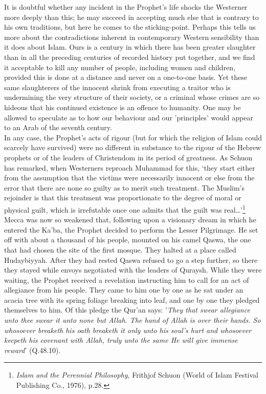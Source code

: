 \documentclass[10pt, twoside,openright]{book}
\begin{document}
It is doubtful whether any incident in the Prophet's life shocks the Westerner more deeply than this; 
he may succeed in accepting much else that is contrary to his own traditions, but here he comes to 
the sticking\hyp{}point. Perhaps this tells us more about the contradictions inherent in contemporary 
Western sensibility than it does about Islam. Ours is a century in which there has been greater 
slaughter than in all the preceding centuries of recorded history put together, and we find it 
acceptable to kill any number of people, including women and children, provided this is done at a 
distance and never on a one\hyp{}to\hyp{}one basis. Yet these same slaughterers of the innocent shrink from 
executing a traitor who is undermining the very structure of their society, or a criminal whose 
crimes are so hideous that his continued existence is an offence to humanity. One may be allowed to 
speculate as to how our behaviour and our 'principles' would appear to an Arab of the seventh 
century. \\

In any case, the Prophet's acts of rigour (but for which the religion of Islam could scarcely have 
survived) were no different in substance to the rigour of the Hebrew prophets or of the leaders of 
Christendom in its period of greatness. As Schuon has remarked, when Westerners reproach Muhammad for 
this, `they start either from the assumption that the victims were necessarily innocent or else from 
the error that there are none so guilty as to merit such treatment. The Muslim's rejoinder is that 
this treatment was proportionate to the degree of moral or physical guilt, which is irrefutable once 
one admits that the guilt was real\ldots{}'\footnote{\emph{Islam and the Perennial Philosophy}, Frithjof Schuon (World of Islam Festival Publishing Co., 1976), p.28.}\\

Mecca was now so weakened that, following upon a visionary dream in which he entered the Ka'ba, the 
Prophet decided to perform the Lesser Pilgrimage. He set off with about a thousand of his people, 
mounted on his camel Qaswa, the one that had chosen the site of the first mosque. They halted at a 
place called Hudaybiyyah. After they had rested Qaswa refused to go a step further, so there they 
stayed while envoys negotiated with the leaders of Quraysh. While they were waiting, the Prophet 
received a revelation instructing him to call for an act of allegiance from his people. They came to 
him one by one as he sat under an acacia tree with its spring foliage breaking into leaf, and one by 
one they pledged themselves to him. Of this pledge the Qur'an says: '\emph{They that swear allegiance unto thee swear it unto none but Allah. The hand of Allah is over their hands. So whosoever breaketh his 
oath breaketh it only unto his soul's hurt and whosoever keepeth his covenant with Allah, truly unto 
the same He will give immense reward}' (Q.48.10). \\
\end{document}
